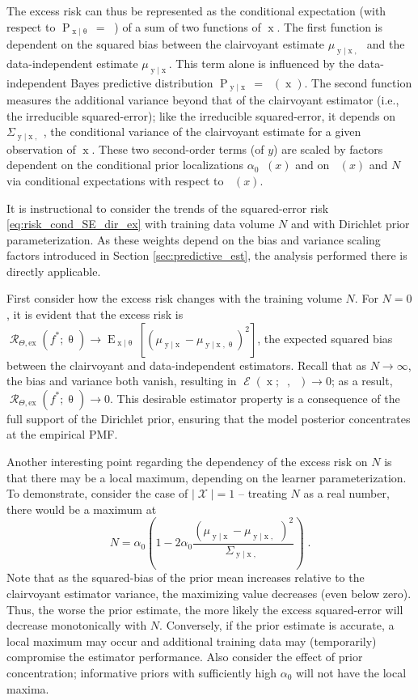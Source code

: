 \documentclass[12pt]{report}
\newcommand{\todohi}[1]{\todo[inline,color=orange!50,linecolor=red]{#1}}
\DeclareMathOperator{\xrm}{\mathrm{x}}
\DeclareMathOperator{\yrm}{\mathrm{y}}
\DeclareMathOperator{\Prm}{\mathrm{P}}
\DeclareMathOperator{\Erm}{\mathrm{E}}
\DeclareMathOperator{\Xcal}{\mathcal{X}}
\DeclareMathOperator{\Rcal}{\mathcal{R}}
\DeclareMathOperator{\Ecal}{\mathcal{E}}
\DeclareMathOperator{\upthetam}{\uptheta_\text{m}}
\DeclareMathOperator{\upthetac}{\uptheta_\text{c}}
\DeclareMathOperator{\uppsim}{\uppsi_\text{m}}
\DeclareMathOperator{\alpham}{\alpha_\text{m}}
\DeclareMathOperator{\alphac}{\alpha_\text{c}}
\begin{document}
The excess risk can thus be represented as the conditional expectation (with respect to $\Prm_{\xrm | \uptheta} = \upthetam$) of a sum of two functions of $\xrm$.  The first function is dependent on the squared bias between the clairvoyant estimate $\mu_{\yrm | \xrm,\upthetac}$ and the data-independent estimate $\mu_{\yrm | \xrm}$. This term alone is influenced by the data-independent Bayes predictive distribution $\Prm_{\yrm | \xrm} = \alphac(\xrm)$. The second function measures the additional variance beyond that of the clairvoyant estimator (i.e., the irreducible squared-error); like the irreducible squared-error, it depends on $\Sigma_{\yrm | \xrm,\upthetac}$, the conditional variance of the clairvoyant estimate for a given observation of $\xrm$. These two second-order terms (of $y$) are scaled by factors dependent on the conditional prior localizations $\alpha_0 \alpham(x)$ and on $\upthetam(x)$ and $N$ via conditional expectations with respect to $\uppsim(x)$.


It is instructional to consider the trends of the squared-error risk \eqref{eq:risk_cond_SE_dir_ex} with training data volume $N$ and with Dirichlet prior parameterization. As these weights depend on the bias and variance scaling factors introduced in Section \ref{sec:predictive_est}, the analysis performed there is directly applicable.


First consider how the excess risk changes with the training volume $N$. For $N=0$, it is evident that the excess risk is $\Rcal_{\Theta, \mathrm{ex}}(f^* ; \uptheta) \to \Erm_{\xrm | \uptheta}\left[ \left( \mu_{\yrm | \xrm} - \mu_{\yrm | \xrm,\uptheta} \right)^2 \right]$,  the expected squared bias between the clairvoyant and data-independent estimators. Recall that as $N \to \infty$, the bias and variance both vanish, resulting in $\Ecal(\xrm; \upthetam, \upthetac) \to 0$; as a result, $\Rcal_{\Theta, \mathrm{ex}}(f^* ; \uptheta) \to 0$. This desirable estimator property is a consequence of the full support of the Dirichlet prior, ensuring that the model posterior concentrates at the empirical PMF.

Another interesting point regarding the dependency of the excess risk on $N$ is that there may be a local maximum, depending on the learner parameterization. To demonstrate, consider the case of $|\Xcal| = 1$ -- treating $N$ as a real number, there would be a maximum at 
\begin{equation}
N = \alpha_0 \left( 1 - 2 \alpha_0 \frac{\left( \mu_{\yrm | \xrm} - \mu_{\yrm | \xrm,\upthetac} \right)^2}{\Sigma_{\yrm | \xrm,\upthetac}} \right) \;.
\end{equation}
\todohi{CHECK, consider x dependency + below}
Note that as the squared-bias of the prior mean increases relative to the clairvoyant estimator variance, the maximizing value decreases (even below zero). Thus, the worse the prior estimate, the more likely the excess squared-error will decrease monotonically with $N$. Conversely, if the prior estimate is accurate, a local maximum may occur and additional training data may (temporarily) compromise the estimator performance. Also consider the effect of prior concentration; informative priors with sufficiently high $\alpha_0$ will not have the local maxima.
\end{document}
